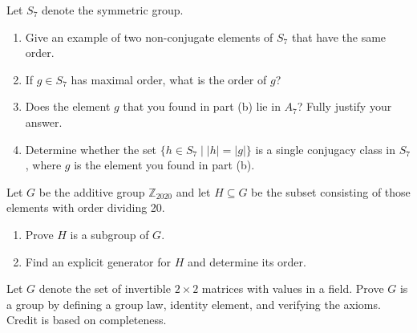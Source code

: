 \documentclass[11pt,twoside,openany]{memoir}
\begin{document}
            \begin{exercise}
            Let $S_7$ denote the symmetric group.
            \begin{enumerate}[label=(\alph*)]
                \item Give an example of two non-conjugate elements of $S_7$ that have the same order.
                \item If $g\in S_7$ has maximal order, what is the order of $g$?
                \item Does the element $g$ that you found in part (b) lie in $A_7$? Fully justify your answer.
                \item Determine whether the set $\{h\in S_7 \mid |h|=|g|\}$ is a single conjugacy class in $S_7$, where $g$ is the element you found in part (b).
            \end{enumerate}
            \end{exercise}
            
            \begin{exercise}
            Let $G$ be the additive group $\mathbb{Z}_{2020}$ and let $H\subseteq G$ be the subset consisting of those elements with order dividing 20.
            \begin{enumerate}[label=(\alph*)]
                \item Prove $H$ is a subgroup of $G$.
                \item Find an explicit generator for $H$ and determine its order.
            \end{enumerate}
            \end{exercise}
            
            \begin{exercise}
            Let $G$ denote the set of invertible $2\times 2$ matrices with values in a field. Prove $G$ is a group by defining a group law, identity element, and verifying the axioms. Credit is based on completeness.
            \end{exercise}
\end{document}
